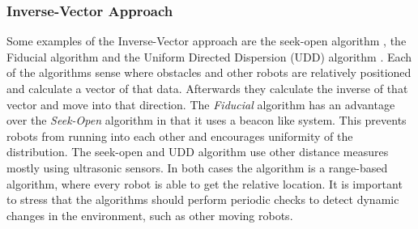 \subsubsection{Inverse-Vector Approach}
Some examples of the Inverse-Vector approach are the seek-open algorithm \cite{morlok2007dispersing}, the Fiducial algorithm \cite{morlok2007dispersing} and the Uniform Directed Dispersion (UDD) algorithm \cite{mclurkin2007distributed}.
Each of the algorithms sense where obstacles and other robots are relatively positioned and calculate a vector of that data. 
Afterwards they calculate the inverse of that vector and move into that direction.
The \emph{Fiducial} algorithm has an advantage over the \emph{Seek-Open} algorithm in that it uses a beacon like system. 
This prevents robots from running into each other and encourages uniformity of the distribution.
The seek-open and UDD algorithm use other distance measures mostly using ultrasonic sensors. 
In both cases the algorithm is a range-based algorithm, where every robot is able to get the relative location. 
It is important to stress that the algorithms should perform periodic checks to detect dynamic changes in the environment, such as other moving robots.

